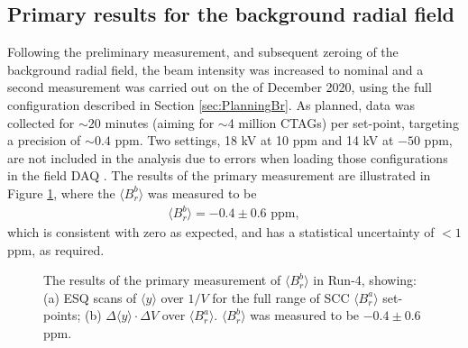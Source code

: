 \subsection{Primary results for the background radial field} 
%
Following the preliminary measurement, and subsequent zeroing of the background radial field, the beam intensity was increased to nominal and a second measurement was carried out on the  of December 2020, using the full configuration described in Section \ref{sec:PlanningBr}. As planned, data was collected for $\sim20$ minutes (aiming for $\sim$4 million CTAGs) per set-point, targeting a precision of $\sim0.4$ ppm. Two settings, 18 kV at 10 ppm and 14 kV at $-50$ ppm, are not included in the analysis due to errors when loading those configurations in the field DAQ \cite{PrimaryMeasurementElog}. The results of the primary measurement are illustrated in Figure \ref{fig:PrimaryFits}, where the $\langle B_{r}^{b} \rangle$ was measured to be %
%
\begin{align*}
  \langle B_{r}^{b} \rangle = -0.4\pm0.6\text{ ppm},
\end{align*}
%
which is consistent with zero as expected, and has a statistical uncertainty of $<1$ ppm, as required.
%
\begin{figure}[t!]
\centering{}
{}
\caption{The results of the primary measurement of $\langle B_{r}^{b} \rangle$ in Run-4, showing: (a) ESQ scans of $\langle y \rangle$ over $1/V$ for the full range of SCC $\langle B_{r}^{a} \rangle$ set-points; (b) $\Delta \langle y \rangle \cdot \Delta V$ over $\langle B_{r}^{a} \rangle$. $\langle B_{r}^{b} \rangle$ was measured to be $-0.4\pm0.6$ ppm.}
\label{fig:PrimaryFits}
\end{figure}

